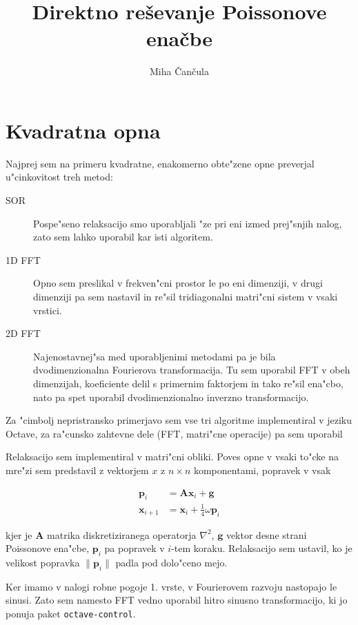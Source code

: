 \documentclass[a4paper,10pt]{article}
\title{Direktno re\v sevanje Poissonove ena\v cbe}
\author{Miha \v Can\v cula}
\renewcommand{\vec}{\mathbf}
\begin{document}
\maketitle

\section{Kvadratna opna}

Najprej sem na primeru kvadratne, enakomerno obte"zene opne preverjal u"cinkovitost treh metod:

\begin{description}
  \item[SOR] Pospe"seno relaksacijo smo uporabljali "ze pri eni izmed prej"snjih nalog, zato sem lahko uporabil kar isti algoritem. 
  \item[1D FFT] Opno sem preslikal v frekven"cni prostor le po eni dimenziji, v drugi dimenziji pa sem nastavil in re"sil tridiagonalni matri"cni sistem v vsaki vrstici. 
  \item[2D FFT] Najenostavnej"sa med uporabljenimi metodami pa je bila dvodimenzionalna Fourierova transformacija. Tu sem uporabil FFT v obeh dimenzijah, koeficiente delil s primernim faktorjem in tako re"sil ena"cbo, nato pa spet uporabil dvodimenzionalno inverzno transformacijo. 
  
\end{description}

Za "cimbolj nepristransko primerjavo sem vse tri algoritme implementiral v jeziku Octave, za ra"cunsko zahtevne dele (FFT, matri"cne operacije) pa sem uporabil 
 
Relaksacijo sem implementiral v matri"cni obliki. Poves opne v vsaki to"cke na mre"zi sem predstavil z vektorjem $x$ z $n\times n$ komponentami, popravek v vsak

\begin{align}
 \vec{p}_i &= \vec A \vec{x}_i + \vec{g} \\
 \vec{x}_{i+1} &= \vec{x}_i + \frac{1}{4} \omega \vec{p}_i
\end{align}

kjer je $\vec A$ matrika diskretiziranega operatorja $\nabla^2$, $\vec{g}$ vektor desne strani Poissonove ena"cbe, $\vec{p}_i$ pa popravek v $i$-tem koraku. Relaksacijo sem ustavil, ko je velikost popravka $\|\vec{p}_i\|$ padla pod dolo"ceno mejo. 

Ker imamo v nalogi robne pogoje 1. vrste, v Fourierovem razvoju nastopajo le sinusi. Zato sem namesto FFT vedno uporabil hitro sinusno transformacijo, ki jo ponuja paket \texttt{octave-control}. 
\end{document}
